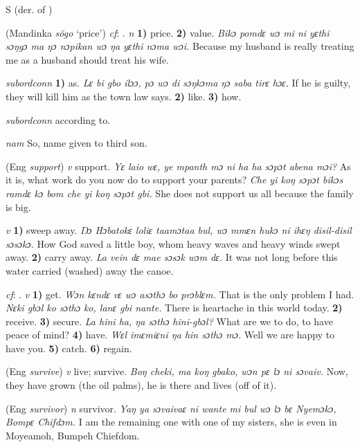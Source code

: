 \begin{letter}{S}
 (der. of ) 

 (Mandinka \textit{sõgo} ‘price') \textit{cf}: . \textit{n} \textbf{1)} price. \textbf{2)} value. \textit{Bikɔ pomdɛ wɔ mi ni yɛthi sɔŋgɔ ma ŋɔ nɔpikan wɔ ŋa yɛthi nɔma wɔi.} Because my husband is really treating me as a husband should treat his wife.

 \textit{subordconn} \textbf{1)} as. \textit{Lɛ bi gbo ilɔɔ, pɔ wɔ di sɔŋkɔma ŋɔ saba tirɛ hɔɛ.} If he is guilty, they will kill him as the town law says. \textbf{2)} like. \textbf{3)} how.

 \textit{subordconn} according to.

 \textit{nam} So, name given to third son.

 (Eng \textit{support}) \textit{v} support. \textit{Yɛ laio wɛ, ye mpanth mɔ ni ha ha sɔpɔt abena mɔi?} As it is, what work do you now do to support your parents? \textit{Che yi koŋ sɔpɔt bikɔs ramdɛ kɔ bom che yi koŋ sɔpɔt gbi.} She does not support us all because the family is big.

 \textit{v} \textbf{1)} sweep away. \textit{Ŋɔ Hɔbatokɛ loliɛ taamɔtaa bul, wɔ mmɛn hukɔ ni ihɛŋ disil-disil sɔsɔkɔ.} How God saved a little boy, whom heavy waves and heavy winds swept away. \textbf{2)} carry away. \textit{La vein dɛ mae sɔsɔk wɔm dɛ.} It was not long before this water carried (washed) away the canoe.

 \textit{cf}: . \textit{v} \textbf{1)} get. \textit{Wɔn kɛndɛ vɛ wɔ asɔthɔ bo prɔblɛm.} That is the only problem I had. \textit{Nɛki gbɔl ko sɔthɔ ko, lanɛ gbi nante.} There is heartache in this world today. \textbf{2)} receive. \textbf{3)} secure. \textit{La hini ha, ŋa sɔthɔ hini-gbɔl?} What are we to do, to have peace of mind? \textbf{4)} have. \textit{Wɛl imɛmiɛni ŋa hin sɔthɔ mɔ.} Well we are happy to have you. \textbf{5)} catch. \textbf{6)} regain.

 (Eng \textit{survive}) \textit{v} live; survive. \textit{Boŋ cheki, ma koŋ gbako, wɔn pɛ lɔ ni sɔvaiv.} Now, they have grown (the oil palms), he is there and lives (off of it). 

 (Eng \textit{survivor}) \textit{n} survivor. \textit{Yaŋ ya sɔvaivaɛ ni wante mi bul wɔ lɔ bɛ Nyemɔkɔ, Bompɛ Chifdɔm.} I am the remaining one with one of my sisters, she is even in Moyeamoh, Bumpeh Chiefdom.


\end{letter}
